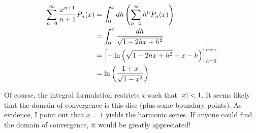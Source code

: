 \item

\begin{align*}
    \sum_{n = 0}^\infty \frac{x^{n + 1}}{n + 1} P_n(x)
    &= \int_0^x dh \left(
        \sum_{n = 0}^\infty h^n P_n(x)
    \right) \\
    &= \int_0^x \frac{dh}{\sqrt{1 - 2hx + h^2}} \\
    &= {\left[ -\ln\left(
        \sqrt{1 - 2hx + h^2} + x - h
    \right) \right]_{h = 0}^{h = x}} \\
    &= \ln\left( \frac{1 + x}{\sqrt{1 - x^2}} \right)
\end{align*}

Of course, the integral formulation restricts $x$ such that $\left| x \right| < 1$.
It seems likely that the domain of convergence is this disc (plus some boundary points).
As evidence, I point out that $x = 1$ yields the harmonic series.
If anyone could find the domain of convergence, it would be greatly appreciated!
